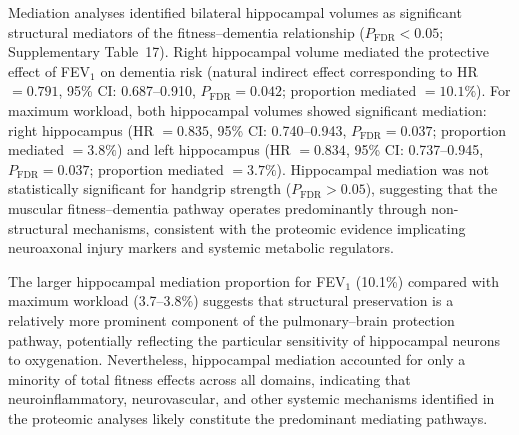 \documentclass{article}
\begin{document}
Mediation analyses identified bilateral hippocampal volumes as significant 
structural mediators of the fitness--dementia relationship 
($P_{\text{FDR}} < 0.05$; Supplementary Table~17).
Right hippocampal volume mediated the protective effect of FEV$_1$ on dementia 
risk (natural indirect effect corresponding to HR $= 0.791$, 95\% CI: 
0.687--0.910, $P_{\text{FDR}} = 0.042$; proportion mediated $= 10.1\%$).
For maximum workload, both hippocampal volumes showed significant 
mediation: right hippocampus (HR $= 0.835$, 95\% CI: 0.740--0.943, 
$P_{\text{FDR}} = 0.037$; proportion mediated $= 3.8\%$) and left 
hippocampus (HR $= 0.834$, 95\% CI: 0.737--0.945, $P_{\text{FDR}} = 0.037$; 
proportion mediated $= 3.7\%$).
Hippocampal mediation was not statistically significant for handgrip strength 
($P_{\text{FDR}} > 0.05$), suggesting that the muscular fitness--dementia 
pathway operates predominantly through non-structural mechanisms, 
consistent with the proteomic evidence implicating neuroaxonal injury 
markers and systemic metabolic regulators.

The larger hippocampal mediation proportion for FEV$_1$ (10.1\%) compared 
with maximum workload (3.7--3.8\%) suggests that structural preservation 
is a relatively more prominent component of the pulmonary--brain protection 
pathway, potentially reflecting the particular sensitivity of hippocampal 
neurons to oxygenation. Nevertheless, hippocampal mediation accounted for 
only a minority of total fitness effects across all domains, indicating 
that neuroinflammatory, neurovascular, and other systemic mechanisms 
identified in the proteomic analyses likely constitute the predominant 
mediating pathways.
\end{document}
